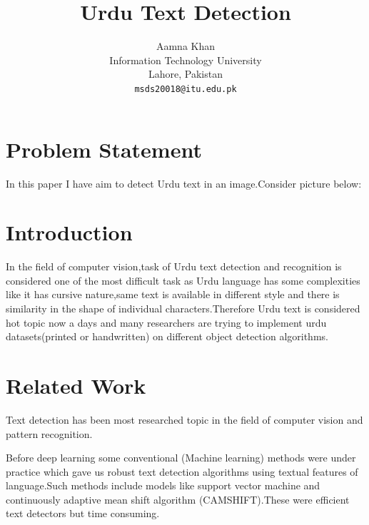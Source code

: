 \documentclass[final]{cvpr}
\begin{document}

\title{Urdu Text Detection}

\author{Aamna Khan\\
Information Technology University\\
Lahore, Pakistan\\
{\tt\small msds20018@itu.edu.pk}

}

\maketitle

\section{Problem Statement}
In this paper I have aim to detect Urdu text in an image.Consider picture below:


\section{Introduction}
In the field of computer vision,task of Urdu text detection and recognition is considered one of the most difficult task as Urdu language has some complexities like it has cursive nature,same text is available in different style and there is similarity in the shape of individual characters.Therefore Urdu text is considered hot topic now a days and many researchers are trying to implement urdu datasets(printed or handwritten) on different object detection algorithms.


\section{Related Work}
Text detection has been most researched topic in the field of computer vision and pattern recognition.

\cite{svm}Before deep learning some conventional (Machine learning) methods were under practice which gave us robust text detection algorithms using textual features of language.Such methods include models like support vector machine and  continuously adaptive mean shift algorithm (CAMSHIFT).These were efficient text detectors but time consuming.
\end{document}
